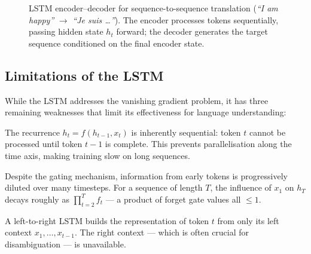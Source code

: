 \begin{figure}[H]
\caption{LSTM encoder--decoder for sequence-to-sequence translation
  (\textit{``I am happy''} $\to$ \textit{``Je suis \ldots''}). The encoder
  processes tokens sequentially, passing hidden state $h_t$ forward; the
  decoder generates the target sequence conditioned on the final encoder state.}
\label{fig:lstm}
\end{figure}

\subsection{Limitations of the LSTM}

While the LSTM addresses the vanishing gradient problem, it has three remaining
weaknesses that limit its effectiveness for language understanding:

\begin{description}[leftmargin=2em, style=nextline]
  \item[\textbf{1.~Sequential bottleneck.}]
    The recurrence $h_t = f(h_{t-1}, x_t)$ is inherently sequential: token $t$
    cannot be processed until token $t{-}1$ is complete. This prevents
    parallelisation along the time axis, making training slow on long sequences.

  \item[\textbf{2.~Memory degradation.}]
    Despite the gating mechanism, information from early tokens is progressively
    diluted over many timesteps. For a sequence of length $T$, the influence of
    $x_1$ on $h_T$ decays roughly as $\prod_{t=2}^{T} f_t$ --- a product of
    forget gate values all $\leq 1$.

  \item[\textbf{3.~Unidirectionality.}]
    A left-to-right LSTM builds the representation of token $t$ from only its
    left context $x_1, \ldots, x_{t-1}$. The right context --- which is often
    crucial for disambiguation --- is unavailable.
\end{description}

